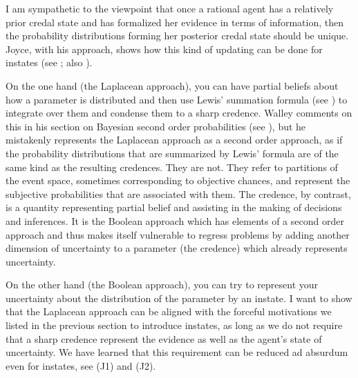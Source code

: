 \documentclass[11pt]{article}
\begin{document}
I am sympathetic to the viewpoint that once a rational agent has a
relatively prior credal state and has formalized her evidence in terms
of information, then the probability distributions forming her
posterior credal state should be unique. Joyce, with his
 approach, shows how this kind of updating can
be done for instates (see ; also
).

On the one hand (the Laplacean approach), you can have partial beliefs
about how a parameter is distributed and then use Lewis' summation
formula (see ) to integrate over them and
condense them to a sharp credence. Walley comments on this
 in his section on Bayesian second order
probabilities (see ), but he mistakenly
represents the Laplacean approach as a second order approach, as if
the probability distributions that are summarized by Lewis' formula
are of the same kind as the resulting credences. They are not. They
refer to partitions of the event space, sometimes corresponding to
objective chances, and represent the subjective probabilities that are
associated with them. The credence, by contrast, is a quantity
representing partial belief and assisting in the making of decisions
and inferences. It is the Boolean approach which has elements of a
second order approach and thus makes itself vulnerable to regress
problems by adding another dimension of uncertainty to a parameter
(the credence) which already represents uncertainty.

On the other hand (the Boolean approach), you can try to represent
your uncertainty about the distribution of the parameter by an
instate. I want to show that the Laplacean approach can be aligned
with the forceful motivations we listed in the previous section to
introduce instates, as long as we do not require that a sharp credence
represent the evidence as well as the agent's state of uncertainty. We
have learned that this requirement can be reduced ad absurdum even for
instates, see (J1) and (J2).
\end{document}
